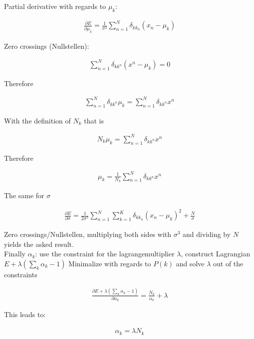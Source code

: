 \documentclass[a4paper]{article}
\begin{document}
Partial derivative with regards to $\mu_k$:

\begin{align*}
\frac{\partial E}{\partial \mu_k} = \frac{1}{\sigma^2} \sum_{n=1}^N \delta_{kk_n} (x_n - \mu_k)
\end{align*}

Zero crossings (Nullstellen):

\begin{align*}
\sum_{n=1}^N \delta_{kk^n} (x^n - \mu_k) = 0
\end{align*}

Therefore

\begin{align*}
\sum_{n=1}^N \delta_{kk^n} \mu_k = \sum_{n=1}^N \delta_{kk^n} x^n
\end{align*}

With the definition of $N_k$ that is 

\begin{align*}
N_k \mu_k = \sum_{n=1}^N \delta_{kk^n}x^n
\end{align*}


Therefore 

\begin{align*}
\mu_k = \frac{1}{N_k} \sum_{n=1}^N \delta_{kk^n}x^n
\end{align*}

The same for $\sigma$

\begin{align*}
\frac{\partial E}{\partial \sigma} = \frac{1}{2 \sigma^3} \sum_{n=1}^N \sum_{k=1}^K \delta_{kk_n} (x_n - \mu_k)^2 + \frac{N}{\sigma}
\end{align*}

Zero crossings/Nullstellen, multiplying both sides with $\sigma^3$ and dividing by $N$ yields the asked result.\\

Finally $\alpha_k$: use the constraint for the lagrangemultiplier $\lambda$, construct Lagrangian $E + \lambda(\sum_k \alpha_k - 1)$  Minimalize with regards to $P(k)$ and solve $\lambda$ out of the constraints

\begin{align*}
\frac{\partial E + \lambda (\sum_k \alpha_k - 1)}{\partial \alpha_k} = \frac{N_k}{\alpha_k} + \lambda
\end{align*}

This leads to:

\begin{align*}
\alpha_k = \lambda N_k
\end{align*}
\end{document}
